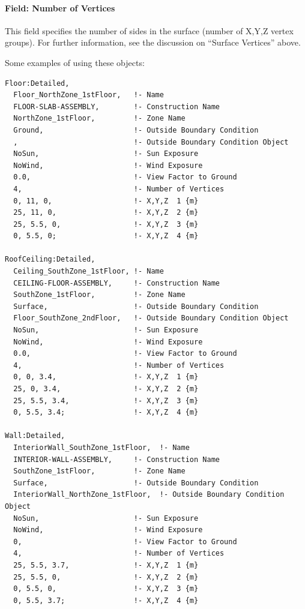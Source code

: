 \paragraph{Field: Number of Vertices}\label{field-number-of-vertices-2}

This field specifies the number of sides in the surface (number of X,Y,Z vertex groups). For further information, see the discussion on ``Surface Vertices'' above.

Some examples of using these objects:

\begin{lstlisting}
Floor:Detailed,
  Floor_NorthZone_1stFloor,   !- Name
  FLOOR-SLAB-ASSEMBLY,        !- Construction Name
  NorthZone_1stFloor,         !- Zone Name
  Ground,                     !- Outside Boundary Condition
  ,                           !- Outside Boundary Condition Object
  NoSun,                      !- Sun Exposure
  NoWind,                     !- Wind Exposure
  0.0,                        !- View Factor to Ground
  4,                          !- Number of Vertices
  0, 11, 0,                   !- X,Y,Z  1 {m}
  25, 11, 0,                  !- X,Y,Z  2 {m}
  25, 5.5, 0,                 !- X,Y,Z  3 {m}
  0, 5.5, 0;                  !- X,Y,Z  4 {m}

RoofCeiling:Detailed,
  Ceiling_SouthZone_1stFloor, !- Name
  CEILING-FLOOR-ASSEMBLY,     !- Construction Name
  SouthZone_1stFloor,         !- Zone Name
  Surface,                    !- Outside Boundary Condition
  Floor_SouthZone_2ndFloor,   !- Outside Boundary Condition Object
  NoSun,                      !- Sun Exposure
  NoWind,                     !- Wind Exposure
  0.0,                        !- View Factor to Ground
  4,                          !- Number of Vertices
  0, 0, 3.4,                  !- X,Y,Z  1 {m}
  25, 0, 3.4,                 !- X,Y,Z  2 {m}
  25, 5.5, 3.4,               !- X,Y,Z  3 {m}
  0, 5.5, 3.4;                !- X,Y,Z  4 {m}

Wall:Detailed,
  InteriorWall_SouthZone_1stFloor,  !- Name
  INTERIOR-WALL-ASSEMBLY,     !- Construction Name
  SouthZone_1stFloor,         !- Zone Name
  Surface,                    !- Outside Boundary Condition
  InteriorWall_NorthZone_1stFloor,  !- Outside Boundary Condition Object
  NoSun,                      !- Sun Exposure
  NoWind,                     !- Wind Exposure
  0,                          !- View Factor to Ground
  4,                          !- Number of Vertices
  25, 5.5, 3.7,               !- X,Y,Z  1 {m}
  25, 5.5, 0,                 !- X,Y,Z  2 {m}
  0, 5.5, 0,                  !- X,Y,Z  3 {m}
  0, 5.5, 3.7;                !- X,Y,Z  4 {m}
\end{lstlisting}

